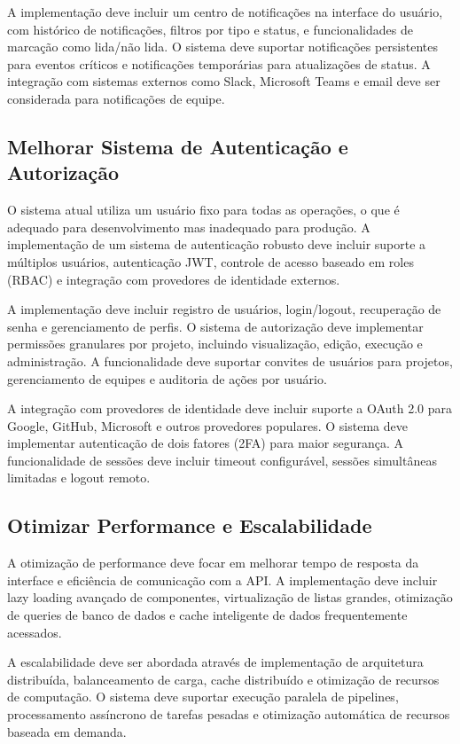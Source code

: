\documentclass[12pt,a4paper]{article}
\begin{document}
A implementação deve incluir um centro de notificações na interface do usuário, com histórico de notificações, filtros por tipo e status, e funcionalidades de marcação como lida/não lida. O sistema deve suportar notificações persistentes para eventos críticos e notificações temporárias para atualizações de status. A integração com sistemas externos como Slack, Microsoft Teams e email deve ser considerada para notificações de equipe.

\subsection{Melhorar Sistema de Autenticação e Autorização}

O sistema atual utiliza um usuário fixo para todas as operações, o que é adequado para desenvolvimento mas inadequado para produção. A implementação de um sistema de autenticação robusto deve incluir suporte a múltiplos usuários, autenticação JWT, controle de acesso baseado em roles (RBAC) e integração com provedores de identidade externos.

A implementação deve incluir registro de usuários, login/logout, recuperação de senha e gerenciamento de perfis. O sistema de autorização deve implementar permissões granulares por projeto, incluindo visualização, edição, execução e administração. A funcionalidade deve suportar convites de usuários para projetos, gerenciamento de equipes e auditoria de ações por usuário.

A integração com provedores de identidade deve incluir suporte a OAuth 2.0 para Google, GitHub, Microsoft e outros provedores populares. O sistema deve implementar autenticação de dois fatores (2FA) para maior segurança. A funcionalidade de sessões deve incluir timeout configurável, sessões simultâneas limitadas e logout remoto.

\subsection{Otimizar Performance e Escalabilidade}

A otimização de performance deve focar em melhorar tempo de resposta da interface e eficiência de comunicação com a API. A implementação deve incluir lazy loading avançado de componentes, virtualização de listas grandes, otimização de queries de banco de dados e cache inteligente de dados frequentemente acessados.

A escalabilidade deve ser abordada através de implementação de arquitetura distribuída, balanceamento de carga, cache distribuído e otimização de recursos de computação. O sistema deve suportar execução paralela de pipelines, processamento assíncrono de tarefas pesadas e otimização automática de recursos baseada em demanda.
\end{document}
